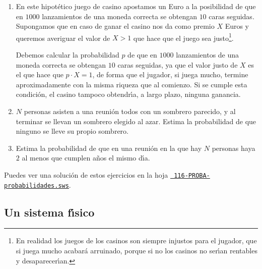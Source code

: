  
\begin{ejer}
  \begin{enumerate}
   \item En este hipot\'etico juego de casino apostamos un Euro a la posibilidad
de que en $1000$ lanzamientos de una moneda correcta se obtengan $10$  caras
seguidas. Supongamos que en caso de ganar el casino nos da como premio $X$ Euros
y queremos averiguar el valor de $X>1$ que hace que el juego sea
justo\footnote{En realidad los juegos de los casinos son siempre injustos
para el jugador,  que si juega mucho  acabar\'a arruinado,  porque si no los
casinos no ser\'{\i}an rentables y desaparecer\'{\i}an.}. 
  
  {\sc Debemos calcular la probabilidad $p$}  de que en $1000$ lanzamientos de
una moneda correcta se obtengan $10$ caras seguidas, ya que el valor justo de
$X$ es el que hace que 
$p\cdot X=1$, de forma que el jugador, si juega mucho,  termine aproximadamente
con la misma riqueza que al comienzo. Si se cumple esta condici\'on, el casino
tampoco obtendr\'{\i}a, a largo plazo,  ninguna ganancia.
  
  \item  $N$ personas asisten a una reuni\'on todos con un sombrero parecido, y
al terminar se llevan un sombrero elegido al azar.  Estima la probabilidad de
que ninguno se lleve su propio sombrero.

\item  Estima la probabilidad de que en una reuni\'on en la que hay $N$ personas
haya $2$ al menos que cumplen a\~nos el mismo d\'{\i}a. 
  
  
  \end{enumerate}

 \end{ejer}

 Puedes ver una soluci\'on de estos ejercicios  en la hoja 
 \href{http://sage.mat.uam.es:8888/home/pub/??/}{\tt
116-PROBA-probabilidades.sws}.
 
 
 \subsection{Un sistema f\'{\i}sico} 
 
